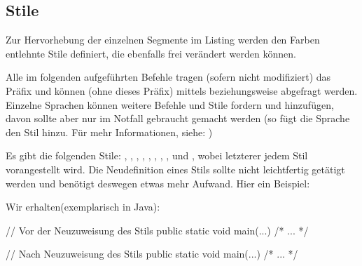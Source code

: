 \documentclass{sopra-base}
\begin{document}
\subsection{Stile}
    Zur Hervorhebung der einzelnen Segmente im Listing werden den Farben entlehnte Stile definiert, die ebenfalls frei verändert werden können. \par{}
    Alle im folgenden aufgeführten Befehle tragen (sofern nicht modifiziert) das Präfix 
     und können (ohne dieses Präfix) mittels  beziehungsweise  abgefragt werden. Einzelne Sprachen können
    weitere Befehle und Stile fordern und hinzufügen, davon sollte aber nur im Notfall gebraucht gemacht werden (so fügt die Sprache  den Stil  hinzu. Für mehr Informationen, siehe: )\par{}
    Es gibt die folgenden Stile: , , , , , , , ,  und , wobei letzterer jedem Stil vorangestellt wird. Die Neudefinition eines Stils sollte
    nicht leichtfertig getätigt werden und benötigt deswegen etwas mehr Aufwand. Hier ein Beispiel:
\begin{plainlatex}[morekeywords={[5]{\\sol@list@define@styles,\\scshape}}]
{\makeatletter
}
\end{plainlatex}
Wir erhalten(exemplarisch in Java):
    \bgroup
\begin{java}
// Vor der Neuzuweisung des Stils
public static void main(...){ /* ... */ }
\end{java}
{\makeatletter
}   \begin{java}
// Nach Neuzuweisung des Stils
public static void main(...){ /* ... */ }
    \end{java}
    \egroup
{\makeatletter
}
%
%
%
%
\end{document}
